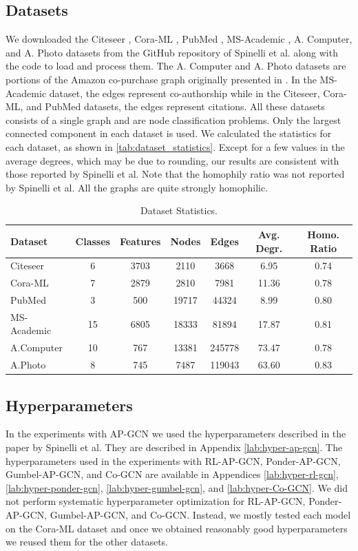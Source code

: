 \documentclass{gdl}
\begin{document}
\subsection{Datasets}
We downloaded the Citeseer \cite{sen2008}, Cora-ML \cite{mccallum2000}, PubMed \cite{namata2012}, MS-Academic \cite{shchur2018}, A. Computer, and A. Photo datasets from the GitHub repository of Spinelli et al. along with the code to load and process them. The A. Computer and A. Photo datasets are portions of the Amazon co-purchase graph originally presented in \cite{mcauley2015}. In the MS-Academic dataset, the edges represent co-authorship while in the Citeseer, Cora-ML, and PubMed datasets, the edges represent citations. All these datasets consists of a single graph and are node classification problems. Only the largest connected component in each dataset is used. We calculated the statistics for each dataset, as shown in \autoref{tab:dataset_statistics}. Except for a few values in the average degrees, which may be due to rounding, our results are consistent with those reported by Spinelli et al. Note that the homophily ratio was not reported by Spinelli et al. All the graphs are quite strongly homophilic.

\begin{table}[h]
    \centering
    \footnotesize\sf
    \setlength{\tabcolsep}{1pt}
    \caption{Dataset Statistics.}
    \captionsetup{justification=centerlast}
    \begin{tabular}{l c c c c c c}
        \toprule
        Dataset & Classes & Features & Nodes & Edges & Avg. Degr. & Homo. Ratio \\
        \midrule
        Citeseer & 6 & 3703 & 2110 & 3668 & 6.95 & 0.74 \\
        Cora-ML & 7 & 2879 & 2810 & 7981 & 11.36 & 0.78 \\
        PubMed & 3 & 500 & 19717 &44324 &8.99 & 0.80 \\
        MS-Academic & 15&6805 & 18333 & 81894 & 17.87 & 0.81 \\
        A.Computer & 10 & 767 & 13381 & 245778 & 73.47 & 0.78 \\
        A.Photo  & 8 & 745 & 7487 & 119043 & 63.60 & 0.83 \\
        \bottomrule
    \end{tabular}
    \label{tab:dataset_statistics}
\end{table}

\subsection{Hyperparameters}
In the experiments with AP-GCN we used the hyperparameters described in the paper by Spinelli et al. They are described in Appendix \ref{lab:hyper-ap-gcn}. The hyperparameters used in the experiments with RL-AP-GCN, Ponder-AP-GCN, Gumbel-AP-GCN, and Co-GCN are available in Appendices \ref{lab:hyper-rl-gcn}, \ref{lab:hyper-ponder-gcn}, \ref{lab:hyper-gumbel-gcn}, and \ref{lab:hyper-Co-GCN}. We did not perform systematic hyperparameter optimization for RL-AP-GCN, Ponder-AP-GCN, Gumbel-AP-GCN, and Co-GCN. Instead, we mostly tested each model on the Cora-ML dataset and once we obtained reasonably good hyperparameters we reused them for the other datasets. 
\end{document}
